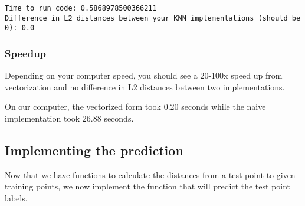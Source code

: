 \documentclass[11pt]{article}
\begin{document}
    \begin{Verbatim}[commandchars=\\\{\}]
Time to run code: 0.5868978500366211
Difference in L2 distances between your KNN implementations (should be 0): 0.0

    \end{Verbatim}

    \hypertarget{speedup}{%
\subsubsection{Speedup}\label{speedup}}

Depending on your computer speed, you should see a 20-100x speed up from
vectorization and no difference in L2 distances between two
implementations.

On our computer, the vectorized form took 0.20 seconds while the naive
implementation took 26.88 seconds.

    \hypertarget{implementing-the-prediction}{%
\subsection{Implementing the
prediction}\label{implementing-the-prediction}}

Now that we have functions to calculate the distances from a test point
to given training points, we now implement the function that will
predict the test point labels.
\end{document}
